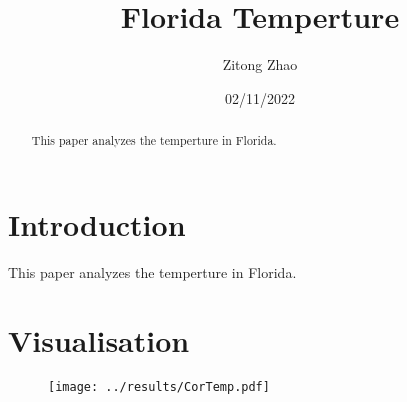 \documentclass[12pt]{article}
\title{Florida Temperture}
\author{Zitong Zhao}
\date{02/11/2022}
\begin{document}
  \maketitle
  
  \begin{abstract}
    This paper analyzes the temperture in Florida.
  \end{abstract}
  
  \section{Introduction}
  This paper analyzes the temperture in Florida.
  
  \section{Visualisation}
  \begin{figure}[h!]
    \centering
    \texttt{[image: ../results/CorTemp.pdf]}
    \label{fig:temperature}
  \end{figure}
\end{document}

